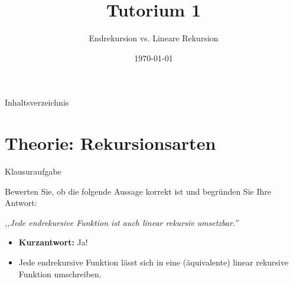\documentclass[aspectratio=169,11pt]{beamer}
\title{\textbf{Tutorium 1}}
\subtitle{Endrekursion vs. Lineare Rekursion}
\institute{Grundlagen der Praktischen Informatik}
\author{}
\date{\today}
\begin{document}
\begin{frame}[plain]
    \titlepage
\end{frame}

\begin{frame}{Inhaltsverzeichnis}
    \tableofcontents
\end{frame}

\section{Theorie: Rekursionsarten}

\begin{frame}{Klausuraufgabe}
    \begin{tcolorbox}[modernbox, title=\faQuestionCircle\ Typische Frage]
        Bewerten Sie, ob die folgende Aussage korrekt ist und begründen Sie Ihre Antwort:
        \vspace{0.3cm}
        
        \textit{,,Jede endrekursive Funktion ist auch linear rekursiv umsetzbar.''}
    \end{tcolorbox}
    
    \vspace{0.5cm}
    \pause
    \begin{itemize}
        \item[\faCheckCircle] \textbf{Kurzantwort:} Ja!
        \item Jede endrekursive Funktion lässt sich in eine (äquivalente) linear rekursive Funktion umschreiben.
    \end{itemize}
\end{frame}
\end{document}
